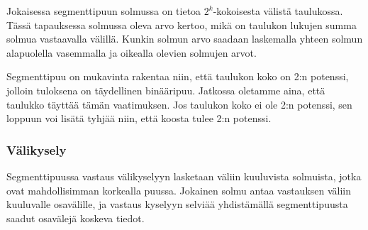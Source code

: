 Jokaisessa segmenttipuun solmussa on tietoa
$2^k$-kokoisesta välistä taulukossa.
Tässä tapauksessa solmussa oleva arvo kertoo,
mikä on taulukon lukujen summa solmua vastaavalla
välillä.
Kunkin solmun arvo saadaan laskemalla yhteen
solmun alapuolella vasemmalla ja oikealla
olevien solmujen arvot.

Segmenttipuu on mukavinta rakentaa niin,
että taulukon koko on 2:n potenssi,
jolloin tuloksena on täydellinen binääripuu.
Jatkossa oletamme aina,
että taulukko täyttää tämän vaatimuksen.
Jos taulukon koko ei ole 2:n potenssi,
sen loppuun voi lisätä tyhjää niin,
että koosta tulee 2:n potenssi.

\subsubsection{Välikysely}

Segmenttipuussa vastaus välikyselyyn lasketaan
väliin kuuluvista solmuista,
jotka ovat mahdollisimman korkealla puussa.
Jokainen solmu antaa vastauksen väliin kuuluvalle osavälille,
ja vastaus kyselyyn selviää yhdistämällä
segmenttipuusta saadut osavälejä koskeva tiedot.


